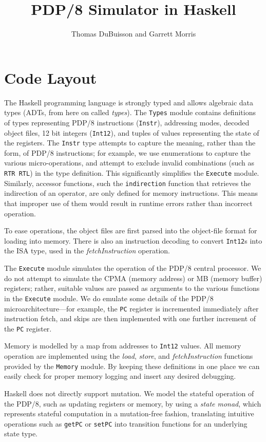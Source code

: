 \documentclass[11pt]{exam}
\title{PDP/8 Simulator in Haskell}
\author{Thomas DuBuisson and Garrett Morris}
\def\inl#1{\texttt{#1}}
\def\Int{\texttt{Int12}}
\begin{document}
\maketitle

\section{Code Layout}
The Haskell programming language is strongly typed and allows algebraic data types (ADTs, from here
on called {\em types}).  The \inl{Types} module contains definitions of types representing PDP/8
instructions (\inl{Instr}), addressing modes, decoded object files, 12 bit integers (\Int{}), and
tuples of values representing the state of the registers.  The \inl{Instr} type attempts to capture
the meaning, rather than the form, of PDP/8 instructions; for example, we use enumerations to
capture the various micro-operations, and attempt to exclude invalid combinations (such as \inl{RTR
  RTL}) in the type definition.  This significantly simplifies the \inl{Execute} module.  Similarly,
accessor functions, such the \inl{indirection} function that retrieves the indirection of an
operator, are only defined for memory instructions.  This means that improper use of them would
result in runtime errors rather than incorrect operation.

To ease operations, the object files are first parsed into the object-file format for loading into
memory.  There is also an instruction decoding to convert \Int{}s into the ISA type, used in the
{\em fetchInstruction} operation.

The \inl{Execute} module simulates the operation of the PDP/8 central processor.  We do not attempt
to simulate the CPMA (memory address) or MB (memory buffer) registers; rather, suitable values are
passed as arguments to the various functions in the \inl{Execute} module.  We do emulate some
details of the PDP/8 microarchitecture---for example, the \inl{PC} register is incremented
immediately after instruction fetch, and skips are then implemented with one further increment of
the \inl{PC} register.

Memory is modelled by a map from addresses to \Int{} values.  All memory operation are implemented
using the {\em load}, {\em store}, and {\em fetchInstruction} functions provided by the \inl{Memory}
module.  By keeping these definitions in one place we can easily check for proper memory logging and
insert any desired debugging.

Haskell does not directly support mutation.  We model the stateful operation of the PDP/8, such as
updating registers or memory, by using a {\em state monad}, which represents stateful computation in
a mutation-free fashion, translating intuitive operations such as \inl{getPC} or \inl{setPC} into
transition functions for an underlying state type.
\end{document}
